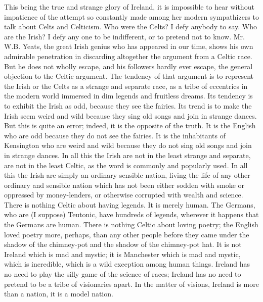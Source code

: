 This being the true and strange glory of Ireland, it is impossible to hear without impatience of the attempt so constantly made among her modern sympathizers to talk about Celts and Celticism. Who were the Celts? I defy anybody to say. Who are the Irish? I defy any one to be indifferent, or to pretend not to know. Mr. W.B. Yeats, the great Irish genius who has appeared in our time, shows his own admirable penetration in discarding altogether the argument from a Celtic race. But he does not wholly escape, and his followers hardly ever escape, the general objection to the Celtic argument. The tendency of that argument is to represent the Irish or the Celts as a strange and separate race, as a tribe of eccentrics in the modern world immersed in dim legends and fruitless dreams. Its tendency is to exhibit the Irish as odd, because they see the fairies. Its trend is to make the Irish seem weird and wild because they sing old songs and join in strange dances. But this is quite an error; indeed, it is the opposite of the truth. It is the English who are odd because they do not see the fairies. It is the inhabitants of Kensington who are weird and wild because they do not sing old songs and join in strange dances. In all this the Irish are not in the least strange and separate, are not in the least Celtic, as the word is commonly and popularly used. In all this the Irish are simply an ordinary sensible nation, living the life of any other ordinary and sensible nation which has not been either sodden with smoke or oppressed by money-lenders, or otherwise corrupted with wealth and science. There is nothing Celtic about having legends. It is merely human. The Germans, who are (I suppose) Teutonic, have hundreds of legends, wherever it happens that the Germans are human. There is nothing Celtic about loving poetry; the English loved poetry more, perhaps, than any other people before they came under the shadow of the chimney-pot and the shadow of the chimney-pot hat. It is not Ireland which is mad and mystic; it is Manchester which is mad and mystic, which is incredible, which is a wild exception among human things. Ireland has no need to play the silly game of the science of races; Ireland has no need to pretend to be a tribe of visionaries apart. In the matter of visions, Ireland is more than a nation, it is a model nation.


